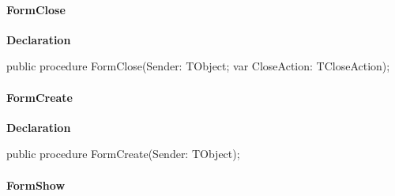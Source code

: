 \documentclass{report}
\newif\ifpdf
\begin{document}
\paragraph*{FormClose}\hspace*{\fill}

\label{xtypefm.TimdFrm-FormClose}
\begin{list}{}{
\setlength{\itemindent}{0cm}
\setlength{\listparindent}{0cm}
\setlength{\leftmargin}{\evensidemargin}
\addtolength{\leftmargin}{\tmplength}
\settowidth{\labelsep}{X}
\addtolength{\leftmargin}{\labelsep}
\setlength{\labelwidth}{\tmplength}
}
\item[\textbf{Declaration}\hfill]
\ifpdf
\begin{flushleft}
\fi
\begin{ttfamily}
public procedure FormClose(Sender: TObject; var CloseAction: TCloseAction);\end{ttfamily}

\ifpdf
\end{flushleft}
\fi

\end{list}
\paragraph*{FormCreate}\hspace*{\fill}

\label{xtypefm.TimdFrm-FormCreate}
\begin{list}{}{
\setlength{\itemindent}{0cm}
\setlength{\listparindent}{0cm}
\setlength{\leftmargin}{\evensidemargin}
\addtolength{\leftmargin}{\tmplength}
\settowidth{\labelsep}{X}
\addtolength{\leftmargin}{\labelsep}
\setlength{\labelwidth}{\tmplength}
}
\item[\textbf{Declaration}\hfill]
\ifpdf
\begin{flushleft}
\fi
\begin{ttfamily}
public procedure FormCreate(Sender: TObject);\end{ttfamily}

\ifpdf
\end{flushleft}
\fi

\end{list}
\paragraph*{FormShow}\hspace*{\fill}
\end{document}
